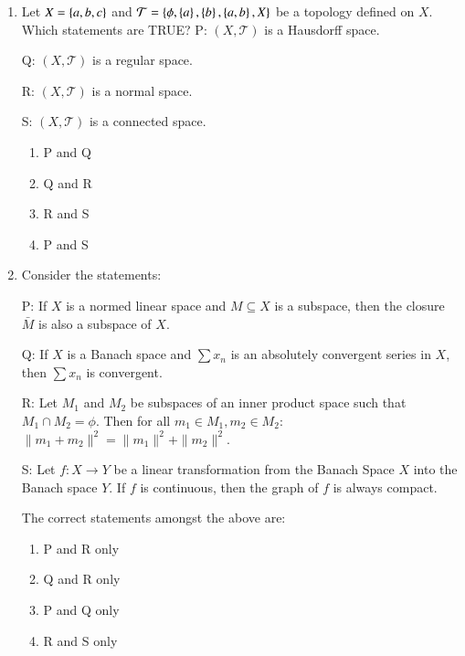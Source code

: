 \documentclass[journal]{IEEEtran}
\numberwithin{equation}{enumi}
\numberwithin{figure}{enumi}
\begin{document}
\begin{enumerate}
\item
Let $X = \left\{a, b, c\right\}$ and $\mathcal{T} = \left\{\phi, \left\{a\right\}, \left\{b\right\}, \left\{a, b\right\}, X\right\}$ be a topology defined on $X$. Which statements are TRUE?
P: $(X, \mathcal{T})$ is a Hausdorff space.

Q: $(X, \mathcal{T})$ is a regular space.

R: $(X, \mathcal{T})$ is a normal space.

S: $(X, \mathcal{T})$ is a connected space.

\hfill{}
\begin{multicols}{2}
\begin{enumerate}
  \item P and Q
  \item Q and R
  \item R and S
  \item P and S
\end{enumerate}
\end{multicols}

\item
Consider the statements:

P: If $X$ is a normed linear space and $M \subseteq X$ is a subspace, then the closure $\bar{M}$ is also a subspace of $X$.

Q: If $X$ is a Banach space and $\sum x_n$ is an absolutely convergent series in $X$, then $\sum x_n$ is convergent.

R: Let $M_1$ and $M_2$ be subspaces of an inner product space such that $M_1 \cap M_2 = \phi$. Then for all $m_1 \in M_1, m_2 \in M_2$: $\| m_1 + m_2 \|^2 = \| m_1 \|^2 + \| m_2 \|^2$.

S: Let $f: X \to Y$ be a linear transformation from the Banach Space $X$ into the Banach space $Y$. If $f$ is continuous, then the graph of $f$ is always compact.

The correct statements amongst the above are:
\hfill{}
\begin{multicols}{2}
\begin{enumerate}
  \item P and R only
  \item Q and R only
  \item P and Q only
  \item R and S only
\end{enumerate}
\end{multicols}


\end{enumerate}
\end{document}
